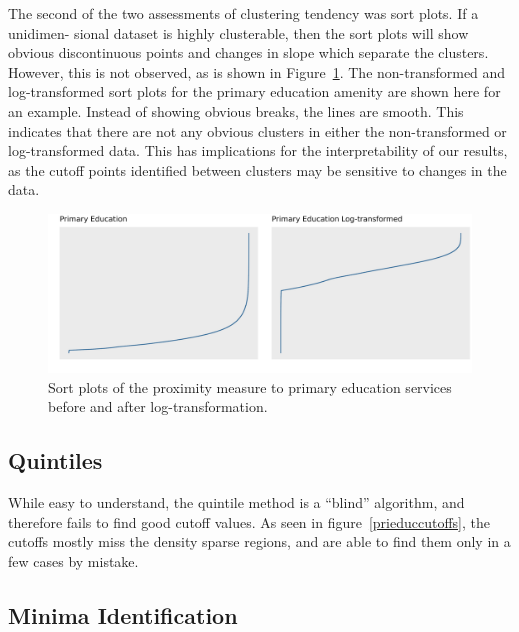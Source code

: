 \documentclass[11pt, a4paper]{article}
\begin{document}
The second of the two assessments of clustering tendency was sort plots. If a unidimen- sional dataset is highly clusterable, then the sort plots will show obvious discontinuous points and changes in slope which separate the clusters. However, this is not observed, as is shown in Figure~\ref{sortplotcompare}. The non-transformed and log-transformed sort plots for the primary education amenity are shown here for an example. Instead of showing obvious breaks, the lines are smooth. This indicates that there are not any obvious clusters in either the non-transformed or log-transformed data. This has implications for the interpretability of our results, as the cutoff points identified between clusters may be sensitive to changes in the data.






\begin{figure}[H]
\centering
\includegraphics[width=\textwidth]{./sort_plot/sort_comparison.png}
\caption[Primary education sort plot]{Sort plots of the proximity measure to primary education services before and after log-transformation.}\label{sortplotcompare}
\end{figure}








\subsection{Quintiles}

While easy to understand, the quintile method is a ``blind'' algorithm, and therefore fails to find good cutoff values. As seen in figure~\ref{prieduccutoffs}, the cutoffs mostly miss the density sparse regions, and are able to find them only in a few cases by mistake.






\subsection{Minima Identification}
\end{document}
